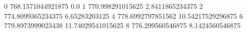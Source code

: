 0 768.1571044921875 0.0
1 770.998291015625 2.8411865234375
2 774.8099365234375 6.65283203125
4 778.6992797851562 10.54217529296875
6 779.8973999023438 11.74029541015625
8 776.299560546875 8.1424560546875
